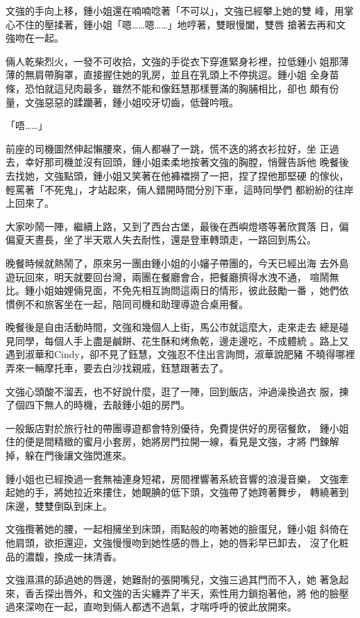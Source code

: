 文強的手向上移，鍾小姐還在喃喃唸著「不可以」，文強已經攀上她的雙
峰，用掌心不住的壓揉著，鍾小姐「嗯……嗯……」地哼著，雙眼慢闔，雙唇
搶著去再和文強吻在一起。

倆人乾柴烈火，一發不可收拾，文強的手從衣下穿進緊身衫裡，拉低鍾小
姐那薄薄的無肩帶胸罩，直接握住她的乳房，並且在乳頭上不停挑逗。鍾小姐
全身苗條，恐怕就這兒肉最多，雖然不能和像鈺慧那樣豐滿的胸脯相比，卻也
頗有份量，文強惡惡的蹂躪著，鍾小姐咬牙切齒，低聲吟哦。

「唔……」

前座的司機圖然伸起懶腰來，倆人都嚇了一跳，慌不迭的將衣衫拉好，坐
正過去，幸好那司機並沒有回頭，鍾小姐柔柔地按著文強的胸膛，悄聲告訴他
晚餐後去找她，文強點頭，鍾小姐又笑著在他褲襠撈了一把，捏了捏他那堅硬
的傢伙，輕罵著「不死鬼」，才站起來，倆人錯開時間分別下車，這時同學們
都紛紛的往岸上回來了。

大家吵鬧一陣，繼續上路，又到了西台古堡，最後在西嶼燈塔等著欣賞落
日，偏偏夏天晝長，坐了半天眾人失去耐性，還是登車轉頭走，一路回到馬公。

晚餐時候就熱鬧了，原來另一團由鍾小姐的小嬸子帶團的，今天已經出海
去外島遊玩回來，明天就要回台灣，兩團在餐廳會合，把餐廳擠得水洩不通，
喧鬧無比。鍾小姐妯娌倆見面，不免先相互詢問這兩日的情形，彼此鼓勵一番
，她們依慣例不和旅客坐在一起，陪同司機和助理導遊合桌用餐。

晚餐後是自由活動時間，文強和幾個人上街，馬公市就這麼大，走來走去
總是碰見同學，每個人手上盡是鹹餅、花生酥和烤魚乾，邊走邊吃，不成體統
。路上又遇到淑華和Cindy，卻不見了鈺慧，文強忍不住出言詢問，淑華說肥豬
不曉得哪裡弄來一輛摩托車，要去白沙找親戚，鈺慧跟著去了。

文強心頭酸不溜丟，也不好說什麼，逛了一陣，回到飯店，沖過澡換過衣
服，揀了個四下無人的時機，去敲鍾小姐的房門。

一般飯店對於旅行社的帶團導遊都會特別優待，免費提供好的房宿餐飲，
鍾小姐住的便是間精緻的蜜月小套房，她將房門拉開一線，看見是文強，才將
門鍊解掉，躲在門後讓文強閃進來。

鍾小姐也已經換過一套無袖連身短裙，房間裡響著系統音響的浪漫音樂，
文強牽起她的手，將她拉近來摟住，她靦腆的低下頭，文強帶了她跨著舞步，
轉繞著到床邊，雙雙倒臥到床上。

文強攬著她的腰，一起相擁坐到床頭，雨點般的吻著她的臉蛋兒，鍾小姐
斜倚在他肩頭，欲拒還迎，文強慢慢吻到她性感的唇上，她的唇彩早已卸去，
沒了化粧品的濃馥，換成一抹清香。

文強濕濕的舔過她的唇邊，她難耐的張開嘴兒，文強三過其門而不入，她
著急起來，香舌探出唇外，和文強的舌尖纏弄了半天，索性用力鎖抱著他，將
他的臉壓過來深吻在一起，直吻到倆人都透不過氣，才喘呼呼的彼此放開來。

